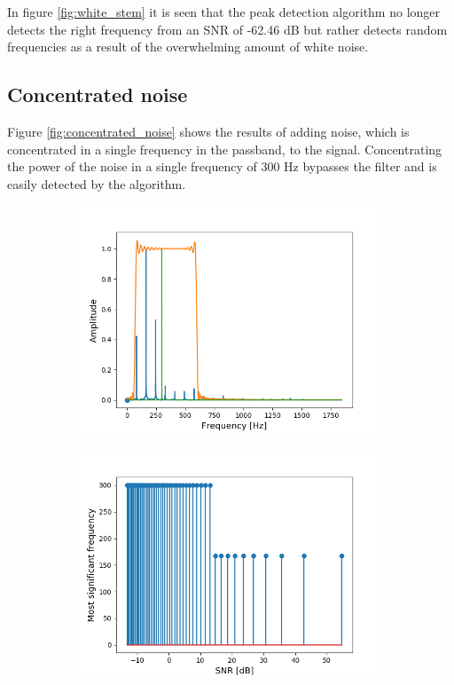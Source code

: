 In figure \ref{fig:white_stem} it is seen that the peak detection algorithm no longer detects the right frequency from an SNR of -62.46 dB but rather detects random frequencies as a result of the overwhelming amount of white noise.

\subsection{Concentrated noise}
Figure \ref{fig:concentrated_noise} shows the results of adding noise, which is concentrated in a single frequency in the passband, to the signal. Concentrating the power of the noise in a single frequency of 300 Hz bypasses the filter and is easily detected by the algorithm.

\begin{figure}[H]
\begin{subfigure}{0.49\textwidth}
\centering
\includegraphics[width=\textwidth]{figures/SNR/concentrated_spectrum.png}
\caption{}
\label{fig:concentrated_spectrum}
\end{subfigure}
\begin{subfigure}{0.49\textwidth}
\centering
\includegraphics[width=\textwidth]{figures/SNR/concentrated_stem.png}

\end{subfigure}
\end{figure}
